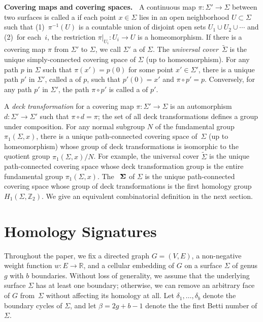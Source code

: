 \documentclass[twoside,leqno,twocolumn]{article}
\def\Z{\mathbb{Z}}
\def\Real{\mathbb{R}}
\def\SIGMABAR{\boldsymbol{\overline{\smash{\Sigma}\vphantom{x}}}}
\def\fakeparagraph#1{\par\medskip\noindent\textbf{#1}}
\begin{document}
\fakeparagraph{Covering maps and covering spaces.~}
A continuous map ${\pi \colon \Sigma' \to \Sigma}$ between two surfaces is called a  if each point $x\in \Sigma$ lies in an open neighborhood $U\subset\Sigma$ such that (1)~$\pi^{-1}(U)$ is a countable union of disjoint open sets $U_1\cup U_2\cup\cdots$ and (2)~for each~$i$, the restriction $\pi|_{U_i}:U_i \to U$ is a homeomorphism.  If there is a covering map $\pi$ from $\Sigma'$ to $\Sigma$, we call $\Sigma'$ a  of $\Sigma$.  The \emph{universal cover}~$\widetilde\Sigma$ is the unique simply-connected covering space of $\Sigma$ (up to homeomorphism).  For any path $p$ in $\Sigma$ such that $\pi(x') = p(0)$ for some point $x'\in\Sigma'$, there is a unique path $p'$ in $\Sigma'$, called a  of $p$, such that $p'(0) = x'$ and $\pi\circ p'=p$.  Conversely, for any path $p'$ in $\Sigma'$, the path $\pi\circ p'$ is called a  of $p'$.

A \emph{deck transformation} for a covering map $\pi\colon \Sigma' \to \Sigma$ is an automorphism $d\colon \Sigma' \to \Sigma'$ such that $\pi\circ d = \pi$; the set of all deck transformations defines a group under composition.  For any normal subgroup $N$ of the fundamental group $\pi_1(\Sigma, x)$, there is a unique path-connected covering space of~$\Sigma$ (up to homeomorphism) whose group of deck transformations is isomorphic to the quotient group $\pi_1(\Sigma, x)/N$.  For example, the universal cover $\widetilde \Sigma$ is the unique path-connected covering space whose deck transformation group is the entire fundamental group $\pi_1(\Sigma, x)$.  The \EMPH{$\Z_2$-homology cover}~$\SIGMABAR$ of $\Sigma$ is the unique path-connected covering space whose group of deck transformations is the first homology group $H_1(\Sigma, \Z_2)$.  We give an equivalent combinatorial definition in the next section.

\section{Homology Signatures}
\label{S:homology}

Throughout the paper, we fix a directed graph $G=(V,E)$, a non-negative weight function $w\colon E\to \Real$, and a cellular embedding of $G$ on a surface $\Sigma$ of genus $g$ with $b$ boundaries.  Without loss of generality, we assume that the underlying surface $\Sigma$ has at least one boundary; otherwise, we can remove an arbitrary face of $G$ from~$\Sigma$ without affecting its homology at all.  Let $\delta_1, \dots, \delta_b$ denote the boundary cycles of $\Sigma$, and let $\beta = 2g+b-1$ denote the the first Betti number of $\Sigma$.
\end{document}
